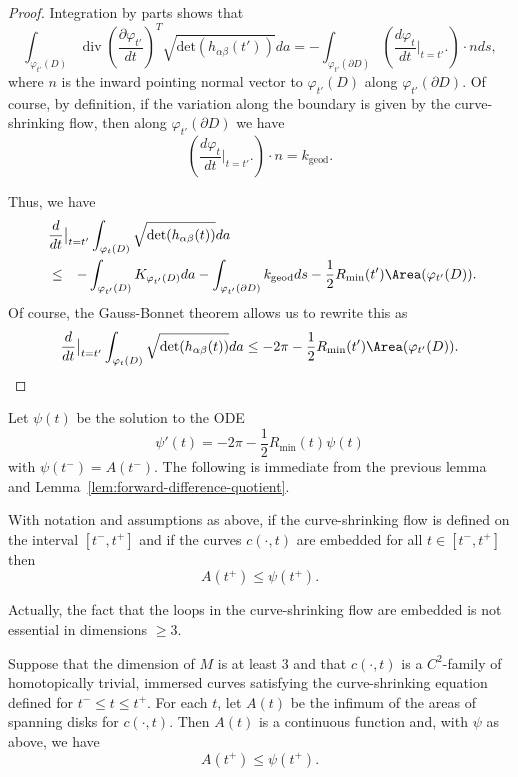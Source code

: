 \begin{proof}
Integration by parts shows that
$$\int_{\varphi_{t'}(D)}\operatorname{div}\left(\frac{\partial
\varphi_{t'}}{dt}\right)^T\sqrt{\mathrm{det}(h_{\alpha\beta}(t'))}da=-\int_{ \varphi_{t'}(\partial
D)}\left(\frac{d\varphi_t}{dt}\bigl|_{t=t'}\bigr.\right)\cdot n
ds,$$ where $n$ is the inward pointing normal vector to
$\varphi_{t'}(D)$ along $\varphi_{t'}(\partial D)$. Of course, by
definition, if the variation along the boundary is given by the
curve-shrinking flow, then along $\varphi_{t'}(\partial D)$ we have
$$\left(\frac{d\varphi_t}{dt}\bigl|_{t=t'}\bigr.\right)\cdot n=k_\mathrm{geod}.$$

Thus, we have
\begin{eqnarray*}\lefteqn{\frac{d}{dt}\bigl|_{t=t'}\bigr.\int_{\varphi_t(D)}\sqrt{\mathrm{det}(h_{\alpha\beta}(t))}da } \\\ & \le &
-\int_{\varphi_{t'}(D)}K_{\varphi_{t'}(D)}da-\int_{\varphi_{t'}(\partial
D)}k_\mathrm{geod}ds-\frac{1}{2}R_{\min}(t')\Area(\varphi_{t'}(D)).\end{eqnarray*} Of course, the Gauss-Bonnet
theorem allows us to rewrite this as
$$\frac{d}{dt}\bigl|_{t=t'}\bigr.\int_{\varphi_t(D)}\sqrt{\mathrm{det}(h_{\alpha\beta}(t))}da \le -2\pi-\frac{1}{2}R_{\min}(t')\Area(\varphi_{t'}(D)).$$
\end{proof}


Let $\psi(t)$ be the solution to the ODE
$$\psi'(t)=-2\pi-\frac{1}{2}R_{\min}(t)\psi(t)$$
with $\psi(t^-)=A(t^-)$. The following is immediate from the
previous lemma and Lemma~\ref{lem:forward-difference-quotient}.

\begin{corollary}
\label{cor:embedded-curve-shrinking-area-comparison}
With notation and assumptions as above, if the curve-shrinking flow
is defined on the interval $[t^-,t^+]$ and if the curves
$c(\cdot,t)$ are embedded for all $t\in [t^-,t^+]$ then
$$A(t^+)\le \psi(t^+).$$
\end{corollary}

Actually, the fact that the loops in the curve-shrinking flow are
embedded is not essential in dimensions $\ge 3$.

\begin{lemma}
\label{lem:immersed-curve-shrinking-area-bound}
\label{nonembeasycase}
Suppose that the dimension of $M$ is at least $3$ and that
$c(\cdot,t)$ is a $C^2$-family of homotopically trivial, immersed
curves satisfying the curve-shrinking equation defined for $t^-\le
t\le t^+$. For each $t$, let $A(t)$ be the infimum of the areas of
spanning disks for  $c(\cdot,t)$. Then $A(t)$ is a continuous
function and, with $\psi$ as above, we have
$$A(t^+)\le \psi(t^+).$$
\end{lemma}


